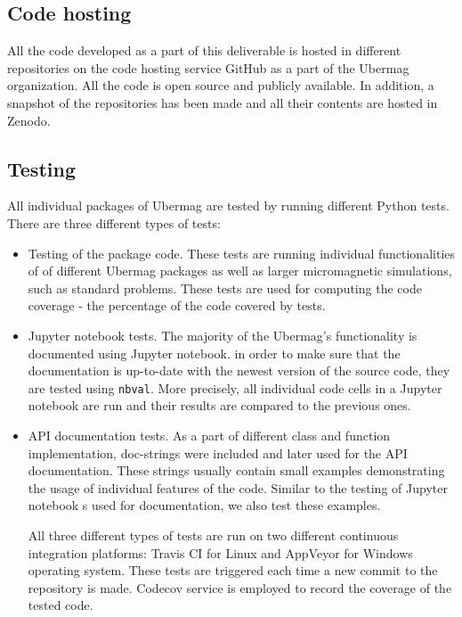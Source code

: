 \documentclass{deliverablereport}
\begin{document}
\subsection{Code hosting}

All the code developed as a part of this deliverable is hosted in different repositories on the code hosting service GitHub as a part of the Ubermag organization. All the code is open source and publicly available. In addition, a snapshot of the repositories has been made and all their contents are hosted in Zenodo.

\subsection{Testing}

All individual packages of Ubermag are tested by running different Python tests. There are three different types of tests:

\begin{itemize}
\item Testing of the package code. These tests are running individual functionalities of of different Ubermag packages as well as larger micromagnetic simulations, such as standard problems. These tests are used for computing the code coverage - the percentage of the code covered by tests.
\item Jupyter notebook tests. The majority of the Ubermag's functionality is documented using Jupyter notebook. in order to make sure that the documentation is up-to-date with the newest version of the source code, they are tested using \texttt{nbval}. More precisely, all individual code cells in a Jupyter notebook are run and their results are compared to the previous ones.
\item API documentation tests. As a part of different class and function implementation, doc-strings were included and later used for the API documentation. These strings usually contain small examples demonstrating the usage of individual features of the code. Similar to the testing of Jupyter notebook s used for documentation, we also test these examples.

  All three different types of tests are run on two different continuous integration platforms: Travis CI for Linux and AppVeyor for Windows operating system. These tests are triggered each time a new commit to the repository is made. Codecov service is employed to record the coverage of the tested code.
\end{itemize}
\end{document}
